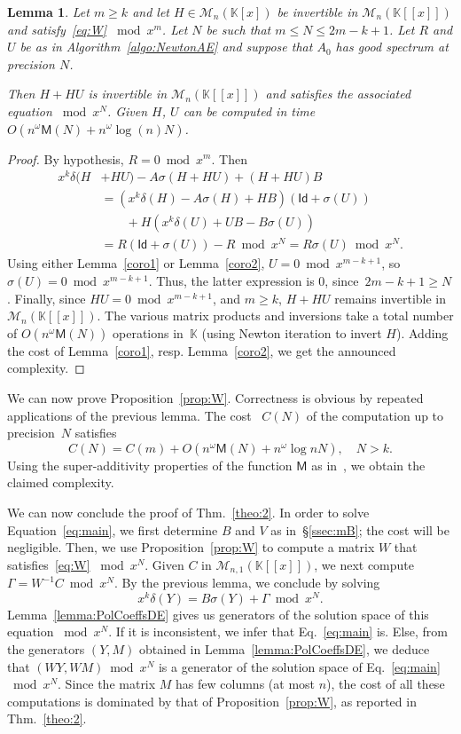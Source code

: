 \documentclass[]{sig-alternate}
\def\partial{\delta}
\def\K {\ensuremath{\mathbb{K}}}
\def\M {\ensuremath{\mathsf{M}}}
\def\Id{\ensuremath{\mathsf{Id}}}
\def\mC {\ensuremath{{C}}}
\def\mW {\ensuremath{{W}}}
\def\mzero {\ensuremath{{0}}}
\newtheorem{Lemma}{Lemma}
\begin{document}
\begin{Lemma}\label{lemma:mu}
  Let $m\ge k$ and let $H\in\mathscr{M}_n(\K[x])$ be 	invertible in
	  $\mathscr{M}_{n}(\K[[x]])$ and satisfy~\eqref{eq:W}  $\bmod x^m$. Let $N$ be such that $m \le N \le
  2m-k+1$. Let $R$ and $U$ be as in Algorithm~\ref{algo:NewtonAE} and
  suppose that $A_0$ has good spectrum at precision $N$.

  Then $H+HU$ is invertible in $\mathscr{M}_{n}(\K[[x]])$ and
  satisfies the associated equation  $\bmod x^{N}$. Given $H$, $U$ can
  be computed in time $O(n^\omega \M(N)+n^\omega\log(n)N)$.
\end{Lemma}
\begin{proof}
By hypothesis,
$R = 0 \bmod
x^m$. Then
\begin{align*}
x^k\partial(H&+HU)-A\sigma(H+HU)+(H+HU)B\\
&=(x^k\partial(H)-A\sigma(H)+HB)(\Id+\sigma(U))\\
&\qquad+H(x^k\partial(U)+UB-B\sigma(U))\\
&=R(\Id+\sigma(U))-R\bmod x^N=R\sigma(U)\bmod x^N.
\end{align*}
Using either Lemma~\ref{coro1} or Lemma~\ref{coro2}, $U=\mzero \bmod
x^{m-k+1}$, so $\sigma(U)=0\bmod x^{m-k+1}$. Thus, the latter
expression is 0, since~$2m-k+1\ge N$. Finally, since $HU=\mzero \bmod
x^{m-k+1}$, and $m\ge k$, $H+HU$ remains invertible in
$\mathscr{M}_n(\K[[x]])$. The various matrix products and inversions
take a total number of $O(n^\omega \M(N))$ operations in~$\K$ (using
Newton iteration to invert $H$). Adding the cost of Lemma~\ref{coro1},
resp. Lemma~\ref{coro2}, we get the announced complexity.
\end{proof}

We can now prove Proposition~\ref{prop:W}.  Correctness is obvious by
repeated applications of the previous lemma. The cost ~$C(N)$ of the
computation up to precision~$N$ satisfies
\[C(N)=C(m)+O(n^\omega\M(N)+n^\omega\log nN),\quad N>k.\]
Using the super-additivity properties of the function $\M$ as
in~\cite[Ch.~9]{GaGe99}, we obtain the claimed complexity. 



We can now conclude the proof of Thm.~\ref{theo:2}. In order to solve
Equation~\eqref{eq:main}, we first determine $B$ and $V$ as
in~\S\ref{ssec:mB}; the cost will be negligible. Then, we use
Proposition~\ref{prop:W} to compute a matrix $\mW$ that
satisfies~\eqref{eq:W} $\bmod x^N$. Given $\mC$ in
$\mathscr{M}_{n,1}(\K[[x]])$, we next compute $\Gamma=\mW^{-1} \mC \bmod
x^N$. By the previous lemma, we conclude by solving
\[x^k\partial(Y)=B\sigma(Y)+\Gamma\bmod x^N.\]
Lemma~\ref{lemma:PolCoeffsDE} gives us generators of the solution
space of this equation $\bmod x^N$. If it is
inconsistent, we infer that Eq.~\eqref{eq:main} is. Else, from
the generators $(Y,M)$ obtained in Lemma~\ref{lemma:PolCoeffsDE}, we
deduce that $(WY,WM) \bmod x^N$ is a generator of the solution space
of Eq.~\eqref{eq:main} $\bmod x^N$. Since the matrix $M$ has few
columns (at most $n$), the cost of all these computations is dominated
by that of Proposition~\ref{prop:W}, as reported in
Thm.~\ref{theo:2}.
\end{document}
